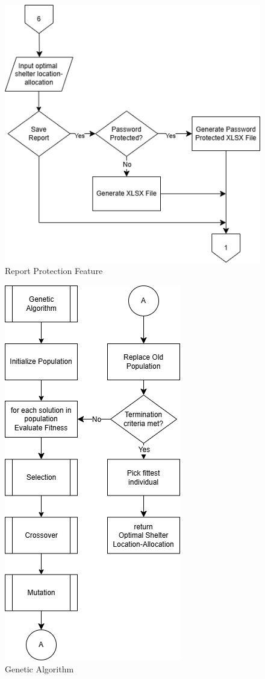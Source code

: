 \begin{appendices}
\begin{centerappendixtitle}
		\begin{figure}[h]
			\centering
			\caption{Report Protection Feature}
			\label{protectFlow}
			\includegraphics[scale=0.7]{appendix/protect f}
		\end{figure}
				
		\begin{figure}[h]
			\centering
			\caption{Genetic Algorithm}
			\label{genalgoFlow}
			\includegraphics[scale=0.7]{appendix/Genetic Algorithm Flowchart}
		\end{figure}
		

\end{centerappendixtitle}
\end{appendices}
